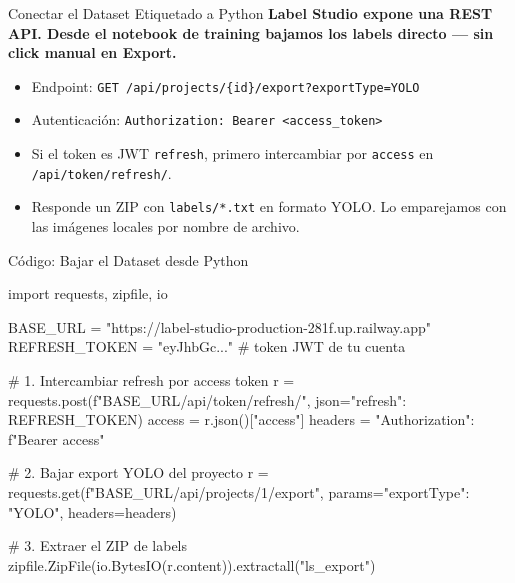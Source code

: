 \documentclass[aspectratio=169, 11pt]{beamer}
\begin{document}
\begin{frame}[shrink]{Conectar el Dataset Etiquetado a Python}
  \vspace{6pt}
  {\footnotesize\color{arcaDark}\bfseries
    Label Studio expone una \textbf{REST API}. Desde el notebook de
    training bajamos los labels directo --- sin click manual en Export.}

  \vspace{12pt}
  {\footnotesize
  \begin{itemize}\setlength{\itemsep}{6pt}
    \item[{\color{arcaRed}\scriptsize\faArrowRight}]
      Endpoint: \texttt{GET /api/projects/\{id\}/export?exportType=YOLO}
    \item[{\color{arcaRed}\scriptsize\faArrowRight}]
      Autenticaci\'on: \texttt{Authorization: Bearer <access\_token>}
    \item[{\color{arcaRed}\scriptsize\faArrowRight}]
      Si el token es JWT \texttt{refresh}, primero intercambiar por
      \texttt{access} en \texttt{/api/token/refresh/}.
    \item[{\color{codeGreen}\scriptsize\faArrowRight}]
      Responde un ZIP con \texttt{labels/*.txt} en formato YOLO.
      Lo emparejamos con las im\'agenes locales por nombre de archivo.
  \end{itemize}
  }
\end{frame}

\begin{frame}{C\'odigo: Bajar el Dataset desde Python}
  \vspace{-4pt}
  \begin{pyblock}
import requests, zipfile, io

BASE_URL = "https://label-studio-production-281f.up.railway.app"
REFRESH_TOKEN = "eyJhbGc..."     # token JWT de tu cuenta

# 1. Intercambiar refresh por access token
r = requests.post(f"{BASE_URL}/api/token/refresh/",
                  json={"refresh": REFRESH_TOKEN})
access = r.json()["access"]
headers = {"Authorization": f"Bearer {access}"}

# 2. Bajar export YOLO del proyecto
r = requests.get(f"{BASE_URL}/api/projects/1/export",
                 params={"exportType": "YOLO"}, headers=headers)

# 3. Extraer el ZIP de labels
zipfile.ZipFile(io.BytesIO(r.content)).extractall("ls_export")
  \end{pyblock}
\end{frame}
\end{document}
